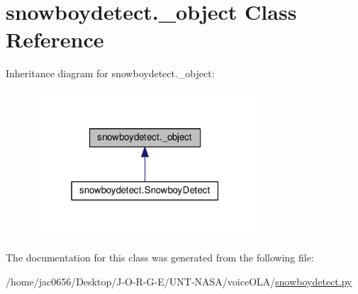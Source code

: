 \hypertarget{classsnowboydetect_1_1__object}{}\section{snowboydetect.\+\_\+object Class Reference}
\label{classsnowboydetect_1_1__object}


Inheritance diagram for snowboydetect.\+\_\+object\+:\nopagebreak
\begin{figure}[H]
\begin{center}
\leavevmode
\includegraphics[width=235pt]{classsnowboydetect_1_1__object__inherit__graph}
\end{center}
\end{figure}


The documentation for this class was generated from the following file\+:\begin{DoxyCompactItemize}
\item 
/home/jac0656/\+Desktop/\+J-\/\+O-\/\+R-\/\+G-\/\+E/\+U\+N\+T-\/\+N\+A\+S\+A/voice\+O\+L\+A/\hyperlink{snowboydetect_8py}{snowboydetect.\+py}\end{DoxyCompactItemize}
